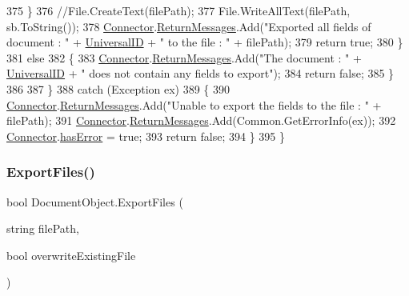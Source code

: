 \begin{DoxyCode}
375                 \}
376                 \textcolor{comment}{//File.CreateText(filePath);}
377                 File.WriteAllText(filePath, sb.ToString());
378                 \mbox{\hyperlink{class_connector}{Connector}}.\mbox{\hyperlink{class_connector_a1ed422674b344524fd77998dcf6a9ba6}{ReturnMessages}}.Add(\textcolor{stringliteral}{"Exported all fields of document : "} + 
      \mbox{\hyperlink{class_document_object_a8b96d04632a2802e7cc5466ca5cee8cf}{UniversalID}} + \textcolor{stringliteral}{" to the file : "} + filePath);
379                 \textcolor{keywordflow}{return} \textcolor{keyword}{true};
380             \}
381             \textcolor{keywordflow}{else}
382             \{
383                 \mbox{\hyperlink{class_connector}{Connector}}.\mbox{\hyperlink{class_connector_a1ed422674b344524fd77998dcf6a9ba6}{ReturnMessages}}.Add(\textcolor{stringliteral}{"The document : "} + 
      \mbox{\hyperlink{class_document_object_a8b96d04632a2802e7cc5466ca5cee8cf}{UniversalID}} + \textcolor{stringliteral}{" does not contain any fields to export"});
384                 \textcolor{keywordflow}{return} \textcolor{keyword}{false};
385             \}
386 
387         \}
388         \textcolor{keywordflow}{catch} (Exception ex)
389         \{
390             \mbox{\hyperlink{class_connector}{Connector}}.\mbox{\hyperlink{class_connector_a1ed422674b344524fd77998dcf6a9ba6}{ReturnMessages}}.Add(\textcolor{stringliteral}{"Unable to export the fields to the file : 
      "} + filePath);
391             \mbox{\hyperlink{class_connector}{Connector}}.\mbox{\hyperlink{class_connector_a1ed422674b344524fd77998dcf6a9ba6}{ReturnMessages}}.Add(Common.GetErrorInfo(ex));
392             \mbox{\hyperlink{class_connector}{Connector}}.\mbox{\hyperlink{class_connector_a079bae21a5417efa53bfe8954c0f533f}{hasError}} = \textcolor{keyword}{true};
393             \textcolor{keywordflow}{return} \textcolor{keyword}{false};
394         \}
395     \}
\end{DoxyCode}
\mbox{\label{class_document_object_a8753abc5a871bf84fc910e6a99936b2b}} 
\subsubsection{\texorpdfstring{Export\+Files()}{ExportFiles()}}
{\footnotesize\ttfamily bool Document\+Object.\+Export\+Files (\begin{DoxyParamCaption}\item[{string}]{file\+Path,  }\item[{bool}]{overwrite\+Existing\+File }\end{DoxyParamCaption})}



